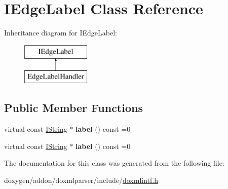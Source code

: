 \hypertarget{class_i_edge_label}{}\section{I\+Edge\+Label Class Reference}
\label{class_i_edge_label}
Inheritance diagram for I\+Edge\+Label\+:\begin{figure}[H]
\begin{center}
\leavevmode
\includegraphics[height=2.000000cm]{class_i_edge_label}
\end{center}
\end{figure}
\subsection*{Public Member Functions}
\begin{DoxyCompactItemize}
\item 
\mbox{\label{class_i_edge_label_a46d27a9e1e9d0fd74e2fca3494e86165}} 
virtual const \mbox{\hyperlink{class_i_string}{I\+String}} $\ast$ {\bfseries label} () const =0
\item 
\mbox{\label{class_i_edge_label_a46d27a9e1e9d0fd74e2fca3494e86165}} 
virtual const \mbox{\hyperlink{class_i_string}{I\+String}} $\ast$ {\bfseries label} () const =0
\end{DoxyCompactItemize}


The documentation for this class was generated from the following file\+:\begin{DoxyCompactItemize}
\item 
doxygen/addon/doxmlparser/include/\mbox{\hyperlink{include_2doxmlintf_8h}{doxmlintf.\+h}}\end{DoxyCompactItemize}
